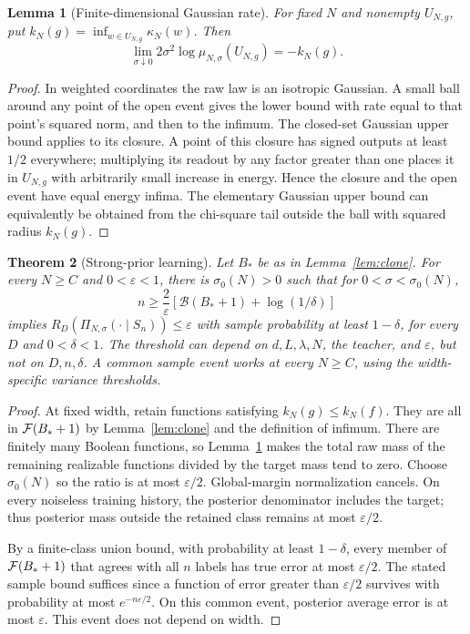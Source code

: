\documentclass[11pt]{article}
\newtheorem{theorem}{Theorem}[section]
\newtheorem{lemma}[theorem]{Lemma}
\theoremstyle{remark}\newtheorem{remark}[theorem]{Remark}
\begin{document}
\begin{lemma}[Finite-dimensional Gaussian rate]\label{lem:rate}
For fixed $N$ and nonempty $U_{N,g}$, put $k_N(g)=\inf_{w\in U_{N,g}}\kappa_N(w)$. Then
\[
 \lim_{\sigma\downarrow0}2\sigma^2\log\mu_{N,\sigma}(U_{N,g})=-k_N(g).
\]
\end{lemma}
\begin{proof}
In weighted coordinates the raw law is an isotropic Gaussian. A small ball around any point of the open event gives the lower bound with rate equal to that point's squared norm, and then to the infimum. The closed-set Gaussian upper bound applies to its closure. A point of this closure has signed outputs at least $1/2$ everywhere; multiplying its readout by any factor greater than one places it in $U_{N,g}$ with arbitrarily small increase in energy. Hence the closure and the open event have equal energy infima. The elementary Gaussian upper bound can equivalently be obtained from the chi-square tail outside the ball with squared radius $k_N(g)$.
\end{proof}

\begin{theorem}[Strong-prior learning]\label{thm:strong}
Let $B_*$ be as in Lemma~\ref{lem:clone}. For every $N\ge C$ and $0<\varepsilon<1$, there is $\sigma_0(N)>0$ such that for $0<\sigma<\sigma_0(N)$,
\[
 n\ge\frac2\varepsilon\left[\mathcal B(B_*+1)+\log(1/\delta)\right]
\]
implies $R_D(\Pi_{N,\sigma}(\cdot\mid S_n))\le\varepsilon$ with sample probability at least $1-\delta$, for every $D$ and $0<\delta<1$. The threshold can depend on $d,L,\lambda,N$, the teacher, and $\varepsilon$, but not on $D,n,\delta$. A common sample event works at every $N\ge C$, using the width-specific variance thresholds.
\end{theorem}
\begin{proof}
At fixed width, retain functions satisfying $k_N(g)\le k_N(f)$. They are all in $\mathcal F(B_*+1)$ by Lemma~\ref{lem:clone} and the definition of infimum. There are finitely many Boolean functions, so Lemma~\ref{lem:rate} makes the total raw mass of the remaining realizable functions divided by the target mass tend to zero. Choose $\sigma_0(N)$ so the ratio is at most $\varepsilon/2$. Global-margin normalization cancels. On every noiseless training history, the posterior denominator includes the target; thus posterior mass outside the retained class remains at most $\varepsilon/2$.

By a finite-class union bound, with probability at least $1-\delta$, every member of $\mathcal F(B_*+1)$ that agrees with all $n$ labels has true error at most $\varepsilon/2$. The stated sample bound suffices since a function of error greater than $\varepsilon/2$ survives with probability at most $e^{-n\varepsilon/2}$. On this common event, posterior average error is at most $\varepsilon$. This event does not depend on width.
\end{proof}
\end{document}
